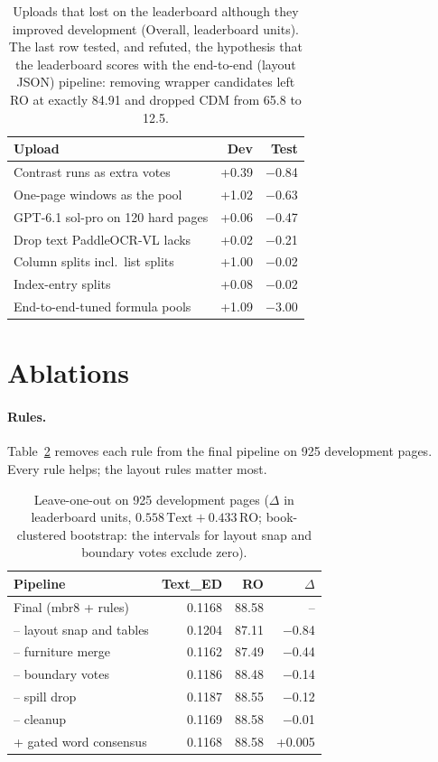 \documentclass[11pt]{article}
\newcommand{\ted}{Text\_ED}
\newcommand{\ro}{RO}
\newcommand{\up}[1]{\textcolor{green!45!black}{#1}}
\newcommand{\dn}[1]{\textcolor{red!65!black}{#1}}
\begin{document}
\begin{table}[t]
\centering\small
\setlength{\tabcolsep}{4pt}
\begin{tabular}{lrr}
\toprule
Upload & Dev & Test \\
\midrule
Contrast runs as extra votes & \up{+0.39} & \dn{$-$0.84} \\
One-page windows as the pool & \up{+1.02} & \dn{$-$0.63} \\
GPT-6.1 sol-pro on 120 hard pages & \up{+0.06} & \dn{$-$0.47} \\
Drop text PaddleOCR-VL lacks & \up{+0.02} & \dn{$-$0.21} \\
Column splits incl.\ list splits & \up{+1.00} & \dn{$-$0.02} \\
Index-entry splits & \up{+0.08} & \dn{$-$0.02} \\
End-to-end-tuned formula pools & \up{+1.09} & \dn{$-$3.00} \\
\bottomrule
\end{tabular}
\caption{Uploads that lost on the leaderboard although they improved development (Overall, leaderboard units). The last row tested, and refuted, the hypothesis that the leaderboard scores with the end-to-end (layout JSON) pipeline: removing wrapper candidates left \ro{} at exactly 84.91 and dropped CDM from 65.8 to 12.5.}
\label{tab:failed}
\end{table}

\section{Ablations}
\label{sec:ablations}

\paragraph{Rules.} Table~\ref{tab:loo} removes each rule from the final pipeline on 925 development pages. Every rule helps; the layout rules matter most.

\begin{table}[t]
\centering\small
\setlength{\tabcolsep}{4pt}
\begin{tabular}{lrrr}
\toprule
Pipeline & \ted & \ro & $\Delta$ \\
\midrule
Final (mbr8 + rules) & 0.1168 & 88.58 & -- \\
\quad -- layout snap and tables & 0.1204 & 87.11 & \dn{$-$0.84} \\
\quad -- furniture merge & 0.1162 & 87.49 & \dn{$-$0.44} \\
\quad -- boundary votes & 0.1186 & 88.48 & \dn{$-$0.14} \\
\quad -- spill drop & 0.1187 & 88.55 & \dn{$-$0.12} \\
\quad -- cleanup & 0.1169 & 88.58 & \dn{$-$0.01} \\
\quad + gated word consensus & 0.1168 & 88.58 & \up{+0.005} \\
\bottomrule
\end{tabular}
\caption{Leave-one-out on 925 development pages ($\Delta$ in leaderboard units, $0.558\,\mathrm{Text}+0.433\,\mathrm{RO}$; book-clustered bootstrap: the intervals for layout snap and boundary votes exclude zero).}
\label{tab:loo}
\end{table}
\end{document}
